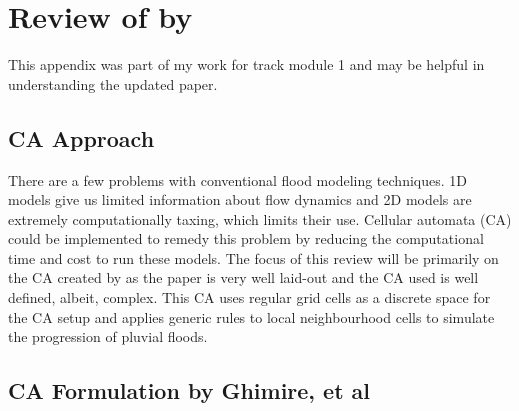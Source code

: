 

\chapter{Review of  by \citeauthor{Ghimire}} %

\label{AppendixC} %

This appendix was part of my work for track module 1 and may be helpful in understanding the updated paper.
\section{CA Approach}
There are a few problems with conventional flood modeling techniques. 1D models give us limited information about flow dynamics and 2D models are extremely computationally taxing, which limits their use. Cellular automata (CA) could be implemented to remedy this problem by reducing the computational time and cost to run these models. The focus of this review will be primarily on the CA created by \cite{Ghimire} as the paper is very well laid-out and the CA used is well defined, albeit, complex. This CA uses regular grid cells as a discrete space for the CA setup and applies generic rules to local neighbourhood cells to simulate the progression of pluvial floods.

\section*{CA Formulation by Ghimire, et al}

